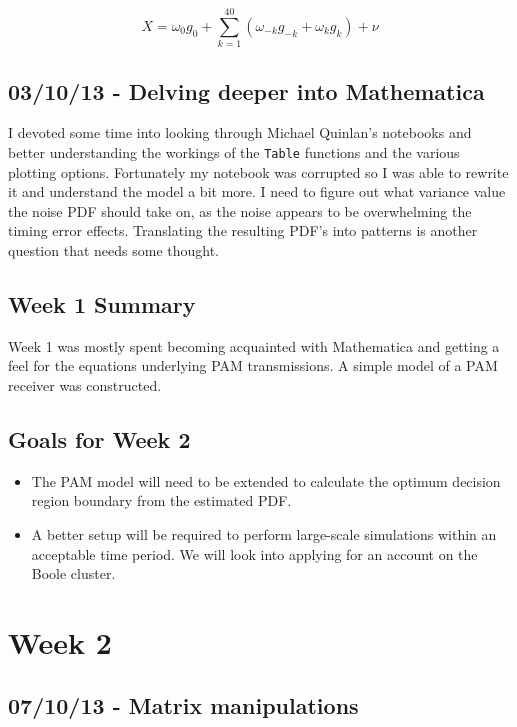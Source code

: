\[
X = \omega_0 g_0 + \sum_{k=1}^{40} ( \omega_{-k} g_{-k} + \omega_k g_k ) + \nu
\]

\subsection{03/10/13 - Delving deeper into Mathematica}

I devoted some time into looking through Michael Quinlan's notebooks and
better understanding the workings of the \texttt{Table} functions and
the various plotting options. Fortunately my notebook was corrupted so I
was able to rewrite it and understand the model a bit more. I need to
figure out what variance value the noise PDF should take on, as the
noise appears to be overwhelming the timing error effects. Translating
the resulting PDF's into patterns is another question that needs some
thought.

\subsection{Week 1 Summary}

Week 1 was mostly spent becoming acquainted with Mathematica and getting
a feel for the equations underlying PAM transmissions. A simple model of
a PAM receiver was constructed.

\subsection{Goals for Week 2}

\begin{itemize}
\itemsep1pt\parskip0pt
\item
  The PAM model will need to be extended to calculate the optimum
  decision region boundary from the estimated PDF.
\item
  A better setup will be required to perform large-scale simulations
  within an acceptable time period. We will look into applying for an
  account on the Boole cluster.
\end{itemize}

\section{Week 2}

\subsection{07/10/13 - Matrix manipulations}

